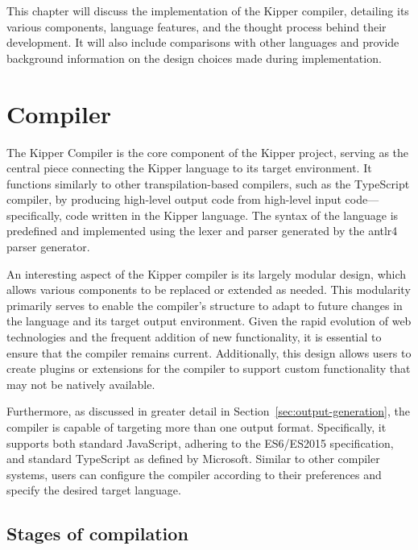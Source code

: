 
This chapter will discuss the implementation of the Kipper compiler, detailing its various components, language features, and the thought process behind their development. It will also include comparisons with other languages and provide background information on the design choices made during implementation.

\section{Compiler}
\label{sec:compiler}

The Kipper Compiler is the core component of the Kipper project, serving as the central piece connecting the Kipper language to its target environment. It functions similarly to other \gls{transpilation}-based compilers, such as the TypeScript compiler, by producing high-level output code from high-level input code—specifically, code written in the Kipper language. The syntax of the language is predefined and implemented using the lexer and parser generated by the \Gls{antlr4} parser generator. 

An interesting aspect of the Kipper compiler is its largely modular design, which allows various components to be replaced or extended as needed. This modularity primarily serves to enable the compiler's structure to adapt to future changes in the language and its target output environment. Given the rapid evolution of web technologies and the frequent addition of new functionality, it is essential to ensure that the compiler remains current. Additionally, this design allows users to create plugins or extensions for the compiler to support custom functionality that may not be natively available.

Furthermore, as discussed in greater detail in Section~\ref{sec:output-generation}, the compiler is capable of targeting more than one output format. Specifically, it supports both standard JavaScript, adhering to the ES6/ES2015 specification, and standard TypeScript as defined by Microsoft. Similar to other compiler systems, users can configure the compiler according to their preferences and specify the desired target language.

\subsection{Stages of compilation}

